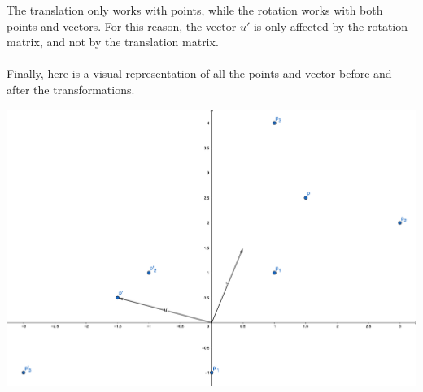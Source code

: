 \documentclass{article}
\begin{document}
The translation only works with points, while the rotation works with both points and vectors. For this reason, the vector $u'$ is only affected by the rotation matrix, and not by the translation matrix. \\ \\
Finally, here is a visual representation of all the points and vector before and after the transformations.

\begin{center}
	\includegraphics[width=14cm]{task_2.png}
\end{center}
\end{document}
